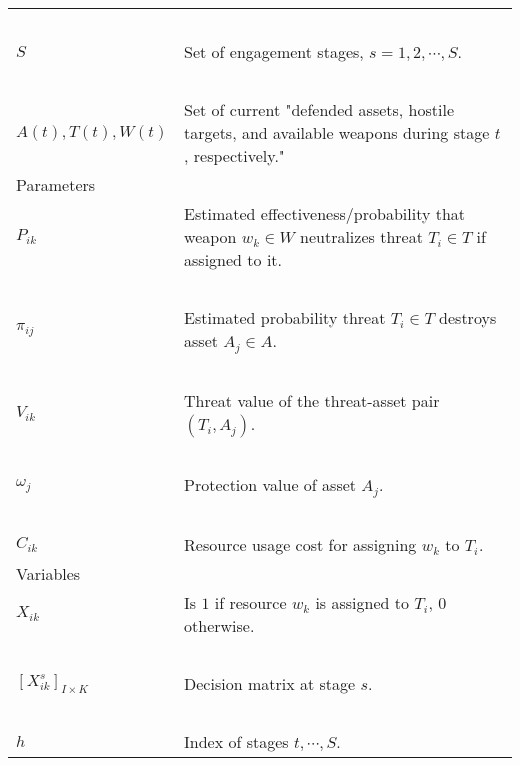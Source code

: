 \documentclass[12pt]{article} %
\begin{document}
\begin{itemize}
\begin{center}
\begin{enumerate}
\begin{center}
\begin{tabular}{|p{4.25cm}  p{8cm}|}
            \ & \ \\
    		$S$ & Set of engagement stages, $s = 1, 2, \cdots, S$. \\
            \ & \ \\
            $A(t), T(t), W(t)$ & Set of current "defended assets, hostile targets, and available weapons during stage $t$, respectively."\\
            \hline
            Parameters & \ \\
            \hline
    		$P_{ik}$ & Estimated effectiveness/probability that weapon $w_k \in W$ neutralizes threat $T_i \in T$ if assigned to it.\\
            \ & \ \\
            $\pi_{ij}$ & Estimated probability threat $T_i \in T$ destroys asset $A_j \in A$. \\
            \ & \ \\
            $V_{ik}$ & Threat value of the threat-asset pair $(T_i, A_j)$. \\
            \ & \ \\
            $\omega_j$ & Protection value of asset $A_j$. \\
            \ & \ \\
            $C_{ik}$ & Resource usage cost for assigning $w_k$ to $T_i$. \\
            \hline
            Variables & \ \\
            \hline
            $X_{ik}$ & Is $1$ if resource $w_k$ is assigned to $T_i$, $0$ otherwise. \\
            \ & \ \\
            $\left[X_{ik}^s\right]_{I\times K}$ & Decision matrix at stage $s$. \\
            \ & \ \\
            $h$ & Index of stages $t, \cdots, S$. \\
    		\hline
    \end{tabular}
    \end{center}
\end{enumerate}
\end{center}


\end{itemize}
\end{document}
